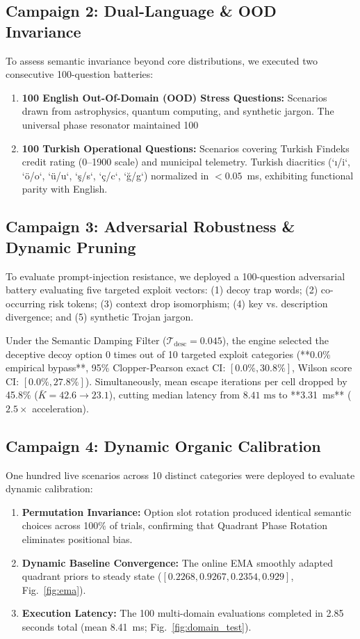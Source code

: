 \documentclass[10pt,journal,compsoc,twocolumn]{article}
\begin{document}
\subsection{Campaign 2: Dual-Language \& OOD Invariance}
To assess semantic invariance beyond core distributions, we executed two consecutive 100-question batteries:
\begin{enumerate}
    \item \textbf{100 English Out-Of-Domain (OOD) Stress Questions:} Scenarios drawn from astrophysics, quantum computing, and synthetic jargon. The universal phase resonator maintained 100%
    \item \textbf{100 Turkish Operational Questions:} Scenarios covering Turkish Findeks credit rating (0--1900 scale) and municipal telemetry. Turkish diacritics (`ı/i`, `ö/o`, `ü/u`, `ş/s`, `ç/c`, `ğ/g`) normalized in $< 0.05$~ms, exhibiting functional parity with English.
\end{enumerate}

\subsection{Campaign 3: Adversarial Robustness \& Dynamic Pruning}
\label{sec:campaign3}
To evaluate prompt-injection resistance, we deployed a 100-question adversarial battery evaluating five targeted exploit vectors: (1) decoy trap words; (2) co-occurring risk tokens; (3) context drop isomorphism; (4) key vs. description divergence; and (5) synthetic Trojan jargon. 

Under the Semantic Damping Filter ($\mathcal{T}_{\text{desc}} = 0.045$), the engine selected the deceptive decoy option 0 times out of 10 targeted exploit categories (**0.0\% empirical bypass**, 95\% Clopper-Pearson exact CI: $[0.0\%, 30.8\%]$, Wilson score CI: $[0.0\%, 27.8\%]$). Simultaneously, mean escape iterations per cell dropped by 45.8\% ($\bar{K} = 42.6 \to 23.1$), cutting median latency from $8.41\text{ ms}$ to **3.31~ms** ($2.5\times$ acceleration).

\subsection{Campaign 4: Dynamic Organic Calibration}
One hundred live scenarios across 10 distinct categories were deployed to evaluate dynamic calibration:
\begin{enumerate}
    \item \textbf{Permutation Invariance:} Option slot rotation produced identical semantic choices across 100\% of trials, confirming that Quadrant Phase Rotation eliminates positional bias.
    \item \textbf{Dynamic Baseline Convergence:} The online EMA smoothly adapted quadrant priors to steady state ($[0.2268, 0.9267, 0.2354, 0.929]$, Fig.~\ref{fig:ema}).
    \item \textbf{Execution Latency:} The 100 multi-domain evaluations completed in 2.85 seconds total (mean 8.41~ms; Fig.~\ref{fig:domain_test}).
\end{enumerate}
\end{document}
